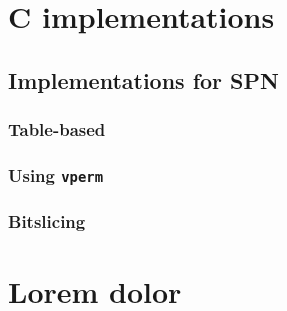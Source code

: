 \appendix
\chapter{C implementations}
\label{app:cimpl}

\section{Implementations for SPN}
\subsection{Table-based}




\subsection{Using \texttt{vperm}}




\subsection{Bitslicing}




\chapter{Lorem dolor}
